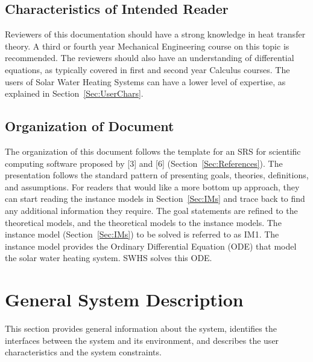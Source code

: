 \documentclass[12pt]{article}
\begin{document}
\subsection{Characteristics of Intended Reader}
\label{Sec:ReaderChars}
Reviewers of this documentation should have a strong knowledge in heat transfer theory. A third or fourth year Mechanical Engineering course on this topic is recommended. The reviewers should also have an understanding of differential equations, as typically covered in first and second year Calculus courses. The users of Solar Water Heating Systems can have a lower level of expertise, as explained in Section~\ref{Sec:UserChars}.
\subsection{Organization of Document}
\label{Sec:DocOrg}
The organization of this document follows the template for an SRS for scientific computing software proposed by {[}3{]} and {[}6{]} (Section~\ref{Sec:References}). The presentation follows the standard pattern of presenting goals, theories, definitions, and assumptions. For readers that would like a more bottom up approach, they can start reading the instance models in Section~\ref{Sec:IMs} and trace back to find any additional information they require.
The goal statements are refined to the theoretical models, and the theoretical models to the instance models. The instance model (Section~\ref{Sec:IMs}) to be solved is referred to as IM1. The instance model provides the Ordinary Differential Equation (ODE) that model the solar water heating system. SWHS solves this ODE.
\section{General System Description}
\label{Sec:GenSysDesc}
This section provides general information about the system, identifies the interfaces between the system and its environment, and describes the user characteristics and the system constraints.
\end{document}
